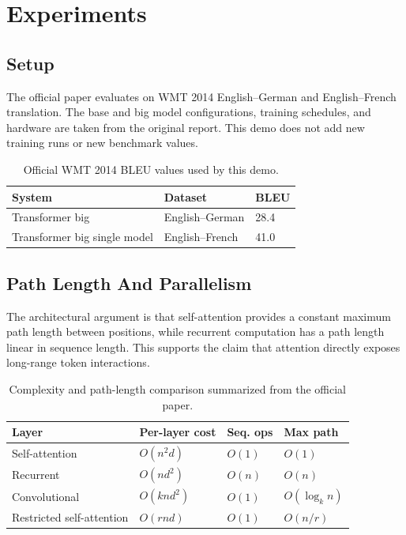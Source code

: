 \documentclass{article}
\begin{document}
\section{Experiments}

\subsection{Setup}

The official paper evaluates on WMT 2014 English--German and English--French translation. The base and big model configurations, training schedules, and hardware are taken from the original report. This demo does not add new training runs or new benchmark values.

\begin{table}[t]
  \caption{Official WMT 2014 BLEU values used by this demo.}
  \label{tab:bleu}
  \centering
  \begin{tabular}{lll}
    \toprule
    System & Dataset & BLEU \\
    \midrule
    Transformer big & English--German & 28.4 \\
    Transformer big single model & English--French & 41.0 \\
    \bottomrule
  \end{tabular}
\end{table}

\subsection{Path Length And Parallelism}

The architectural argument is that self-attention provides a constant maximum path length between positions, while recurrent computation has a path length linear in sequence length. This supports the claim that attention directly exposes long-range token interactions.

\begin{table}[t]
  \caption{Complexity and path-length comparison summarized from the official paper.}
  \label{tab:complexity}
  \centering
  \small
  \begin{tabular}{llll}
    \toprule
    Layer & Per-layer cost & Seq. ops & Max path \\
    \midrule
    Self-attention & $O(n^2 d)$ & $O(1)$ & $O(1)$ \\
    Recurrent & $O(n d^2)$ & $O(n)$ & $O(n)$ \\
    Convolutional & $O(k n d^2)$ & $O(1)$ & $O(\log_k n)$ \\
    Restricted self-attention & $O(r n d)$ & $O(1)$ & $O(n/r)$ \\
    \bottomrule
  \end{tabular}
\end{table}
\end{document}
